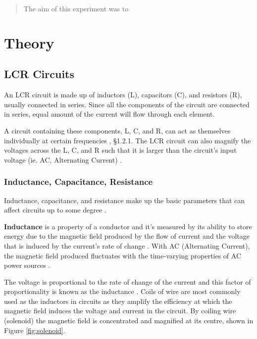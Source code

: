 \documentclass[12pt]{article}
\begin{document}
\begin{abstract}

The aim of this experiment was to



\end{abstract}




\section{Theory}

\subsection{LCR Circuits}
An LCR circuit is made up of inductors (L), capacitors (C), and resistors (R), usually connected in series.
Since all the components of the circuit are connected in series, equal amount of the current will flow through each element.
\cite{unacademy}

A circuit containing these components, L, C, and R, can act as themselves individually at certain frequencies
\cite{learnabout}, §1.2.1.
The LCR circuit can also magnify the voltages across the L, C, and R such that it is larger than the  circuit's input voltage (ie. AC, Alternating Current)
\cite{learnabout}.

\subsubsection{Inductance, Capacitance, Resistance}

Inductance, capacitance, and resistance make up the basic parameters that can affect circuits up to some degree
\cite{elecnotes}.

\textbf{Inductance} is a property of a conductor
\cite{britinductance}
and it's measured by its ability to store energy due to the magnetic field produced by the flow of current
\cite{elecnotes}
and the voltage that is induced by the current's rate of change
\cite{britinductance}.
With AC (Alternating Current), the magnetic field produced fluctuates with the time-varying properties of AC power sources
\cite{elecnotes,britinductance}.

The voltage is proportional to the rate of change of the current and this factor of proportionality is known as the inductance
\cite{britinductance}.
Coils of wire are most commonly used as the inductors in circuits as they amplify \cite{elecnotes} the efficiency at which the magnetic field induces
the voltage and current in the circuit. By coiling wire (solenoid) the magnetic field is concentrated and magnified at its centre, shown in Figure \ref{fig:solenoid}.
\end{document}
